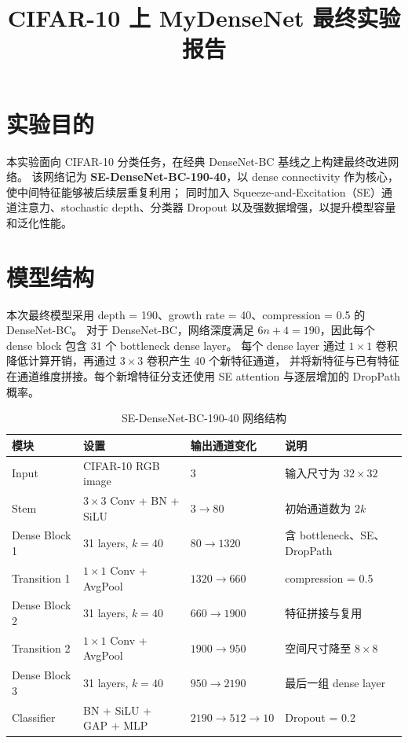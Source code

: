 \documentclass[UTF8]{ctexart}
\title{CIFAR-10 上 MyDenseNet 最终实验报告}
\author{}
\date{}
\begin{document}
\maketitle

\section{实验目的}

本实验面向 CIFAR-10 分类任务，在经典 DenseNet-BC 基线之上构建最终改进网络。
该网络记为 \textbf{SE-DenseNet-BC-190-40}，以 dense connectivity 作为核心，使中间特征能够被后续层重复利用；
同时加入 Squeeze-and-Excitation（SE）通道注意力、stochastic depth、分类器 Dropout 以及强数据增强，以提升模型容量和泛化性能。

\section{模型结构}

本次最终模型采用 depth = 190、growth rate = 40、compression = 0.5 的 DenseNet-BC。
对于 DenseNet-BC，网络深度满足 $6n+4=190$，因此每个 dense block 包含 31 个 bottleneck dense layer。
每个 dense layer 通过 $1\times1$ 卷积降低计算开销，再通过 $3\times3$ 卷积产生 40 个新特征通道，
并将新特征与已有特征在通道维度拼接。每个新增特征分支还使用 SE attention 与逐层增加的 DropPath 概率。

\begin{table}[H]
    \centering
    \caption{SE-DenseNet-BC-190-40 网络结构}
    \begin{tabularx}{\textwidth}{lllY}
        \toprule
        模块 & 设置 & 输出通道变化 & 说明 \\
        \midrule
        Input & CIFAR-10 RGB image & 3 & 输入尺寸为 $32\times32$ \\
        Stem & $3\times3$ Conv + BN + SiLU & $3\rightarrow80$ & 初始通道数为 $2k$ \\
        Dense Block 1 & 31 layers, $k=40$ & $80\rightarrow1320$ & 含 bottleneck、SE、DropPath \\
        Transition 1 & $1\times1$ Conv + AvgPool & $1320\rightarrow660$ & compression = 0.5 \\
        Dense Block 2 & 31 layers, $k=40$ & $660\rightarrow1900$ & 特征拼接与复用 \\
        Transition 2 & $1\times1$ Conv + AvgPool & $1900\rightarrow950$ & 空间尺寸降至 $8\times8$ \\
        Dense Block 3 & 31 layers, $k=40$ & $950\rightarrow2190$ & 最后一组 dense layer \\
        Classifier & BN + SiLU + GAP + MLP & $2190\rightarrow512\rightarrow10$ & Dropout = 0.2 \\
        \bottomrule
    \end{tabularx}
\end{table}
\end{document}
